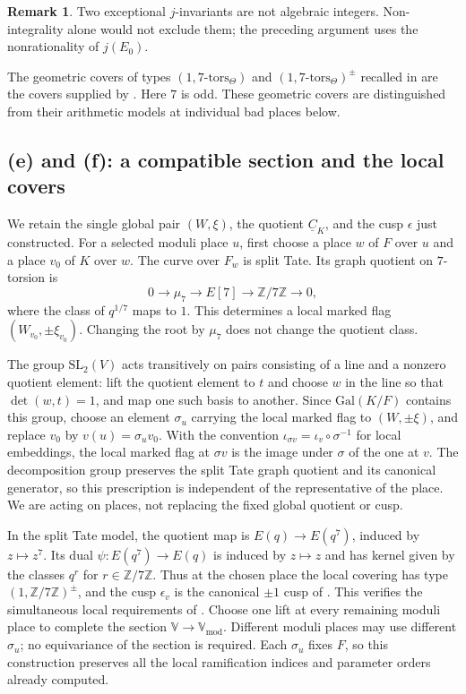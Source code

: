 \documentclass[11pt]{article}
\theoremstyle{plain}
\theoremstyle{definition}
\newtheorem{remark}[theorem]{Remark}
\newcommand{\Vmod}{\mathbb{V}_{\mathrm{mod}}}
\newcommand{\VV}{\mathbb{V}}
\begin{document}
\begin{remark}
Two exceptional $j$-invariants are not algebraic integers.
Non-integrality alone would not exclude them; the preceding argument
uses the nonrationality of $j(E_0)$.
\end{remark}

The geometric covers of types $(1,7\text{-tors}_{\Theta})$ and
$(1,7\text{-tors}_{\Theta})^{\pm}$ recalled in
\cite[Definition 3.1(d)]{IUT1} are the covers supplied by
\cite[Proposition 2.2, Definition 2.3]{EtTh}.
Here $7$ is odd. These geometric covers are distinguished from their
arithmetic models at individual bad places below.

\subsection{(e) and (f): a compatible section and the local covers}
\label{sec:e}

We retain the single global pair $(W,\xi)$, the quotient $\underline C_K$,
and the cusp $\epsilon$ just constructed.
For a selected moduli place $u$, first choose a place $w$ of $F$ over $u$
and a place $v_0$ of $K$ over $w$.
The curve over $F_w$ is split Tate. Its graph quotient on $7$-torsion is
\[
 0\longrightarrow\mu_7\longrightarrow E[7]
 \longrightarrow\mathbb Z/7\mathbb Z\longrightarrow0,
\]
where the class of $q^{1/7}$ maps to $1$.
This determines a local marked flag $(W_{v_0},\pm\xi_{v_0})$.
Changing the root by $\mu_7$ does not change the quotient class.

The group $\mathrm{SL}_2(V)$ acts transitively on pairs consisting of a
line and a nonzero quotient element: lift the quotient element to $t$ and
choose $w$ in the line so that $\det(w,t)=1$, and map one such basis to
another. Since $\mathrm{Gal}(K/F)$ contains this group, choose an element
$\sigma_u$ carrying the local marked flag to $(W,\pm\xi)$, and replace
$v_0$ by $v(u)=\sigma_u v_0$.
With the convention $\iota_{\sigma v}=\iota_v\circ\sigma^{-1}$ for local
embeddings, the local marked flag at $\sigma v$ is the image under $\sigma$
of the one at $v$.
The decomposition group preserves the split Tate graph quotient and its
canonical generator, so this prescription is independent of the representative
of the place.
We are acting on places, not replacing the fixed global quotient or cusp.

In the split Tate model, the quotient map is
$E(q)\to E(q^7)$, induced by $z\mapsto z^7$.
Its dual $\psi:E(q^7)\to E(q)$ is induced by $z\mapsto z$ and has
kernel given by the classes $q^r$ for $r\in\mathbb Z/7\mathbb Z$.
Thus at the chosen place the local covering has type
$(1,\mathbb Z/7\mathbb Z)^{\pm}$, and the cusp $\epsilon_v$ is the canonical
$\pm1$ cusp of \cite[Definition 2.5(i)]{EtTh}.
This verifies the simultaneous local requirements of
\cite[Definition 3.1(e),(f)]{IUT1}.
Choose one lift at every remaining moduli place to complete the section
$\VV\to\Vmod$.
Different moduli places may use different $\sigma_u$; no equivariance of
the section is required. Each $\sigma_u$ fixes $F$, so this construction
preserves all the local ramification indices and parameter orders already
computed.
\end{document}

